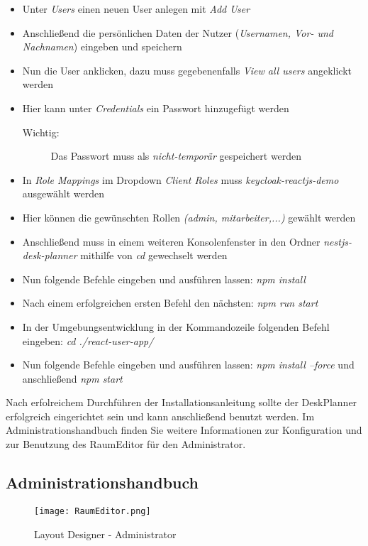 \begin{itemize}
    \item   Unter \textit{Users} einen neuen User anlegen mit \textit{Add User}
    \item   Anschließend die persönlichen Daten der Nutzer (\textit{Usernamen, Vor- und Nachnamen}) eingeben und speichern
    \item   Nun die User anklicken, dazu muss gegebenenfalls \textit{View all users} angeklickt werden
    \item   Hier kann unter \textit{Credentials} ein Passwort hinzugefügt werden
    \begin{description}
    \item[Wichtig:] Das Passwort muss als \textit{nicht-temporär} gespeichert werden
    \end{description}
    \item   In \textit{Role Mappings} im Dropdown \textit{Client Roles} muss \textit{keycloak-reactjs-demo} ausgewählt werden
    \item   Hier können die gewünschten Rollen \textit{(admin, mitarbeiter,...)} gewählt werden
    \item   Anschließend muss in einem weiteren Konsolenfenster in den Ordner \textit{nestjs-desk-planner} mithilfe von \textit{cd} gewechselt werden
    \item   Nun folgende Befehle eingeben und ausführen lassen: \textit{npm install}
    \item   Nach einem erfolgreichen ersten Befehl den nächsten: \textit{npm run start}
    \item   In der Umgebungsentwicklung in der Kommandozeile folgenden Befehl eingeben: \textit{cd ./react-user-app/}
    \item   Nun folgende Befehle eingeben und ausführen lassen: \textit{npm install --force} und anschließend \textit{npm start}
\end{itemize}

Nach erfolreichem Durchführen der Installationsanleitung sollte der DeskPlanner erfolgreich eingerichtet sein und kann anschließend benutzt werden.
Im Administrationshandbuch finden Sie weitere Informationen zur Konfiguration und zur Benutzung des RaumEditor für den Administrator.
\subsection{Administrationshandbuch}

\begin{figure}[!h]
    \centering
    \texttt{[image: RaumEditor.png]}
    \caption{Layout Designer - Administrator}
    \label{fig:LayoutDesigner}
\end{figure}

